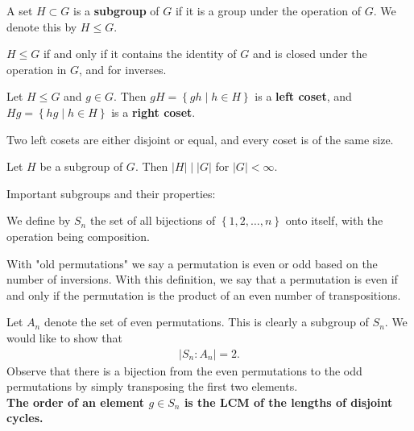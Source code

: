 \documentclass{memoir}
\begin{document}
\begin{defn}[Subgroup]
	A set \(H \subset G\) is a \textbf{subgroup} of \(G\) if it is a group under the operation of \(G\). We denote this by \(H \leq G\).
\end{defn}
\(H\leq G\) if and only if it contains the identity of \(G\) and is closed under the operation in \(G\), and for inverses.
\begin{defn}[Coset]
	Let \(H\leq G\) and \(g \in G\). Then \(gH = \left\{gh \mid h \in H \right\} \) is a \textbf{left coset}, and \(Hg = \left\{hg \mid h \in H \right\} \) is a \textbf{right coset}.
\end{defn}
Two left cosets are either disjoint or equal, and every coset is of the same size.
\begin{thm}
	Let \(H\) be a subgroup of \(G\). Then \(\left| H \right| \mid \left| G \right| \) for \(\left| G \right| <\infty\).
\end{thm}
Important subgroups and their properties:
\begin{defn}[Permutations]
	We define by \(S_n\) the set of all bijections of \(\left\{ 1,2,\ldots,n \right\} \) onto itself, with the operation being composition.
\end{defn}
\begin{cor}
With "old permutations" we say a permutation is even or odd based on the number of inversions. With this definition, we say that a permutation is even if and only if the permutation is the product of an even number of transpositions.
\end{cor}
Let \(A_n\) denote the set of even permutations. This is clearly a subgroup of \(S_n\). We would like to show that
\begin{align*}
	\left| S_n : A_n \right| =2.
\end{align*}
Observe that there is a bijection from the even permutations to the odd permutations by simply transposing the first two elements.\\

\textbf{The order of an element \(g \in S_n\) is the LCM of the lengths of disjoint cycles.}
\end{document}
